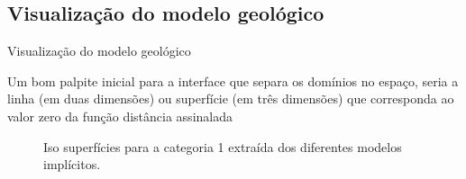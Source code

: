 \documentclass[aspectratio=169]{beamer}
\begin{document}
\subsection{Visualização do modelo geológico}

\begin{frame}{Visualização do modelo geológico}

Um bom palpite inicial para a interface que separa os domínios no espaço, seria a linha (em duas dimensões) ou superfície (em três dimensões) que corresponda ao valor zero da função distância assinalada

\begin{figure}[H]
	\caption{Iso superfícies para a categoria 1 extraída dos diferentes modelos implícitos.} \label{isosup}
	\centering
\end{figure}
\end{frame}
\end{document}
